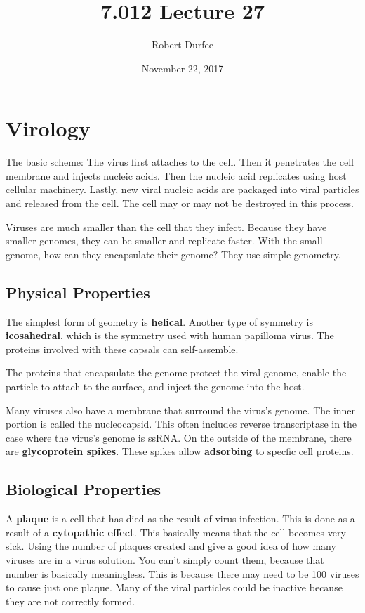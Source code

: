 \documentclass{article}
\title{ 7.012 Lecture 27 }
\author{ Robert Durfee }
\date{ November 22, 2017 }
\begin{document}
\maketitle

\section{ Virology }

The basic scheme: The virus first attaches to the cell. Then it penetrates the
cell membrane and injects nucleic acids. Then the nucleic acid replicates using
host cellular machinery. Lastly, new viral nucleic acids are packaged into viral
particles and released from the cell. The cell may or may not be destroyed in
this process.

Viruses are much smaller than the cell that they infect. Because they have
smaller genomes, they can be smaller and replicate faster. With the small
genome, how can they encapsulate their genome? They use simple genometry.

\subsection{Physical Properties}

The simplest form of geometry is \textbf{helical}. Another type of symmetry is
\textbf{icosahedral}, which is the symmetry used with human papilloma virus. The
proteins involved with these capsals can self-assemble.

The proteins that encapsulate the genome protect the viral genome, enable the
particle to attach to the surface, and inject the genome into the host.

Many viruses also have a membrane that surround the virus's genome. The inner
portion is called the nucleocapsid. This often includes reverse transcriptase in
the case where the virus's genome is ssRNA. On the outside of the membrane,
there are \textbf{glycoprotein spikes}. These spikes allow \textbf{adsorbing} to
specfic cell proteins.

\subsection{Biological Properties}

A \textbf{plaque} is a cell that has died as the result of virus infection. This
is done as a result of a \textbf{cytopathic effect}. This basically means that
the cell becomes very sick. Using the number of plaques created and give a good
idea of how many viruses are in a virus solution. You can't simply count them,
because that number is basically meaningless. This is because there may need to
be 100 viruses to cause just one plaque. Many of the viral particles could be
inactive because they are not correctly formed.
\end{document}
